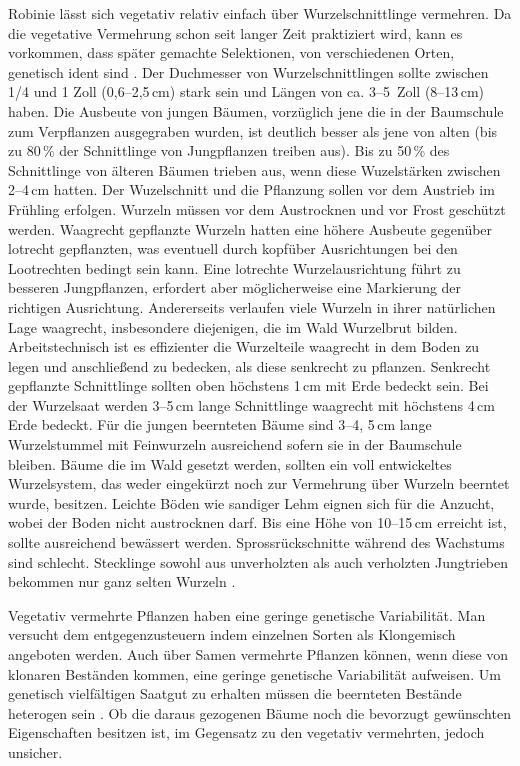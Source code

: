 \documentclass[twocolumn]{scrartcl}
\begin{document}
Robinie lässt sich vegetativ relativ einfach über Wurzelschnittlinge
vermehren. Da die vegetative Vermehrung schon seit langer Zeit
praktiziert wird, kann es vorkommen, dass später gemachte Selektionen,
von verschiedenen Orten, genetisch ident sind
\citep{liesebach2012robinie}. Der Duchmesser von Wurzelschnittlingen
sollte zwischen 1/4 und 1 Zoll (0,6--2,5\,cm) stark sein und Längen
von ca. 3--5~Zoll (8--13\,cm) haben. Die Ausbeute von jungen Bäumen,
vorzüglich jene die in der Baumschule zum Verpflanzen ausgegraben
wurden, ist deutlich besser als jene von alten (bis zu 80\,\% der
Schnittlinge von Jungpflanzen treiben aus).  Bis zu 50\,\% des
Schnittlinge von älteren Bäumen trieben aus, wenn diese Wuzelstärken
zwischen 2--4\,cm hatten.  Der Wuzelschnitt und die Pflanzung sollen
vor dem Austrieb im Frühling erfolgen. Wurzeln müssen vor dem
Austrocknen und vor Frost geschützt werden. Waagrecht gepflanzte
Wurzeln hatten eine höhere Ausbeute gegenüber lotrecht gepflanzten,
was eventuell durch kopfüber Ausrichtungen bei den Lootrechten bedingt
sein kann. Eine lotrechte Wurzelausrichtung führt zu besseren
Jungpflanzen, erfordert aber möglicherweise eine Markierung der
richtigen Ausrichtung. Andererseits verlaufen viele Wurzeln in ihrer
natürlichen Lage waagrecht, insbesondere diejenigen, die im Wald
Wurzelbrut bilden. Arbeitstechnisch ist es effizienter die
Wurzelteile waagrecht in dem Boden zu legen und anschließend zu
bedecken, als diese senkrecht zu pflanzen.
Senkrecht gepflanzte Schnittlinge sollten oben höchstens 1\,cm mit
Erde bedeckt sein. Bei der Wurzelsaat werden 3--5\,cm lange Schnittlinge
waagrecht mit höchstens 4\,cm Erde bedeckt.
Für die jungen beernteten Bäume sind 3--4, 5\,cm lange Wurzelstummel mit Feinwurzeln ausreichend sofern sie in der Baumschule bleiben. Bäume die
im Wald gesetzt werden, sollten ein voll entwickeltes Wurzelsystem,
das weder eingekürzt noch zur Vermehrung über Wurzeln beerntet wurde, besitzen.
Leichte Böden wie sandiger
Lehm eignen sich für die Anzucht, wobei der Boden nicht austrocknen darf.
Bis eine Höhe von 10--15\,cm erreicht ist, sollte ausreichend bewässert werden.
Sprossrückschnitte während des Wachstums sind
schlecht. Stecklinge sowohl aus unverholzten als auch verholzten
Jungtrieben bekommen nur ganz selten Wurzeln
\citep{swingle1937robinie,redei2001robinieVermehrung,redei2005robinieVermehrung}.

Vegetativ vermehrte Pflanzen haben eine geringe genetische Variabilität.
Man versucht dem entgegenzusteuern indem einzelnen Sorten als Klongemisch
angeboten werden. Auch über Samen vermehrte Pflanzen können, wenn diese
von klonaren Beständen kommen, eine geringe genetische Variabilität aufweisen.
Um genetisch vielfältigen Saatgut zu erhalten müssen die beernteten Bestände
heterogen sein \citep{pakull2024robinieKlon}. Ob die daraus gezogenen Bäume
noch die bevorzugt gewünschten Eigenschaften besitzen ist, im Gegensatz
zu den vegetativ vermehrten, jedoch unsicher.
\end{document}
